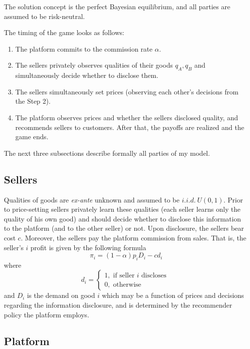 \documentclass[a4paper]{article}
\begin{document}
	
The solution concept is the perfect Bayesian equilibrium, and all parties are assumed to be risk-neutral.


The timing of the game looks as follows:
\begin{enumerate}
	\item The platform commits to the commission rate $\alpha$.
	\item The sellers privately observes qualities of their goods $q_A, q_B$ and simultaneously decide whether to disclose them.
	\item The sellers simultaneously set prices (observing each other's decisions from the Step 2).
	\item The platform observes prices and whether the sellers disclosed quality, and recommends sellers to customers. After that, the payoffs are realized and the game ends.
\end{enumerate}




The next three subsections describe formally all parties of my model.



\subsection{Sellers}

Qualities of goods are \textit{ex-ante} unknown and assumed to be $i.i.d.\ U(0, 1)$. Prior to price-setting sellers privately learn these qualities (each seller learns only the quality of his own good) and should decide whether to disclose this information to the platform (and to the other seller) or not. Upon disclosure, the sellers bear cost $c$. Moreover, the sellers pay the platform commission from sales. That is, the seller's $i$ profit is given by the following formula
$$\pi_i = (1-\alpha)p_i D_i - c d_i$$
where $$d_i = \begin{cases}
1, \text{ if seller }i\text{ discloses }\\
0, \text{ otherwise }
\end{cases}$$ and $D_i$ is the demand on good $i$ which may be a function of prices and decisions regarding the information disclosure, and is determined by the recommender policy the platform employs.
	


	\subsection{Platform}
\end{document}
